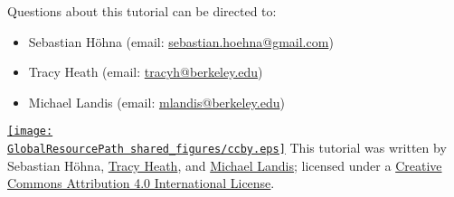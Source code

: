 Questions about this tutorial can be directed to: \\\vspace{-10mm}
\begin{itemize}
\item Sebastian H\"{o}hna (email: \href{mailto:sebastian.hoehna@gmail.com}{sebastian.hoehna@gmail.com}) \\\vspace{-8mm} 
\item Tracy Heath (email: \href{mailto:tracyh@berkeley.edu}{tracyh@berkeley.edu}) \\\vspace{-8mm}
\item Michael Landis (email: \href{mailto:mlandis@berkeley.edu}{mlandis@berkeley.edu})
\end{itemize}


\href{http://creativecommons.org/licenses/by/4.0/}{\texttt{[image: \\GlobalResourcePath shared\_figures/ccby.eps]}} This tutorial was written by Sebastian H\"{o}hna, \href{http://phylo.bio.ku.edu/content/tracy-heath}{Tracy Heath}, and \href{http://michaeljameslandis.com/}{Michael Landis}; licensed under a \href{http://creativecommons.org/licenses/by/4.0/}{Creative Commons Attribution 4.0 International License}. 





